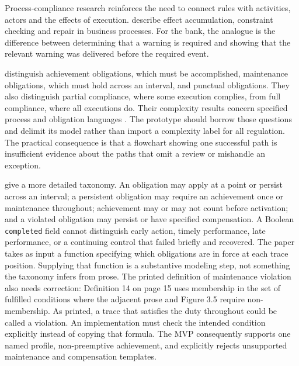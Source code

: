 Process-compliance research reinforces the need to connect rules with activities,
actors and the effects of execution. \citet{ghose2007} describe effect accumulation,
constraint checking and repair in business processes. For the bank, the analogue
is the difference between determining that a warning is required and showing
that the relevant warning was delivered before the required event.

\citet[sec.~2]{compliancehard2015} distinguish achievement obligations, which must
be accomplished, maintenance obligations, which must hold across an interval,
and punctual obligations. They also distinguish partial compliance, where some
execution complies, from full compliance, where all executions do. Their
complexity results concern specified process and obligation languages
\citep[secs.~3--4]{compliancehard2015}. The prototype should borrow those questions
and delimit its model rather than import a complexity label for all regulation.
The practical consequence is that a flowchart showing one successful path is
insufficient evidence about the paths that omit a review or mishandle an exception.


\citet[sec.~3, Definitions 10--17]{normative2016} give a more detailed taxonomy.
An obligation may apply at a point or persist across an interval; a persistent
obligation may require an achievement once or maintenance throughout; achievement
may or may not count before activation; and a violated obligation may persist or
have specified compensation. A Boolean \texttt{completed} field cannot distinguish
early action, timely performance, late performance, or a continuing control that
failed briefly and recovered. The paper takes as input a function specifying
which obligations are in force at each trace position. Supplying that function
is a substantive modeling step, not something the taxonomy infers from prose.
The printed definition of maintenance violation also needs correction:
Definition 14 on page 15 uses membership in the set of fulfilled conditions
where the adjacent prose and Figure 3.5 require non-membership. As printed,
a trace that satisfies the duty throughout could be called a violation.
An implementation must check the intended condition explicitly instead of
copying that formula.
The MVP consequently supports one named profile, non-preemptive achievement,
and explicitly rejects unsupported maintenance and compensation templates.

